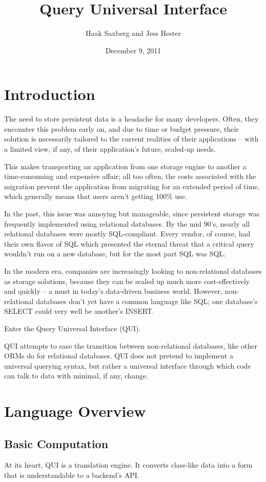 \documentclass{article} %
\title{Query Universal Interface}
\author{Haak Saxberg and Jess Hester}
\date{December 9, 2011}
\begin{document}
\maketitle
\newpage
\tableofcontents

\newpage
\section{Introduction}
The need to store persistent data is a headache for many developers. Often, they encounter this problem early on, and due to time
or budget pressure, their solution is necessarily tailored to the current realities of their applications -- with a limited view, if any, of 
their application's future, scaled-up needs.

This makes transporting an application from one storage engine to another a time-consuming and expensive affair; all too often, the
costs associated with the migration prevent the application from migrating for an extended period of time, which generally means that
users aren't getting 100\% use.

In the past, this issue was annoying but manageable, since persistent storage was frequently implemented using relational databases.
By the mid 90's, nearly all relational databases were mostly SQL-compliant. Every vendor, of course, had their own flavor of SQL which
presented the eternal threat that a critical query wouldn't run on a new database, but for the most part SQL was SQL.

In the modern era, companies are increasingly looking to non-relational databases as storage solutions, because they can be scaled up
much more cost-effectively and quickly -- a must in today's data-driven business world. However, non-relational databases don't yet have
a common language like SQL; one database's SELECT could very well be another's INSERT.

Enter the Query Universal Interface (QUI).

QUI attempts to ease the transition between non-relational databases, like other ORMs do for relational databases. QUI does not pretend
to implement a universal querying syntax, but rather a universal interface through which code can talk to data with minimal, if any, change.

\section{Language Overview}
\subsection{Basic Computation}
At its heart, QUI is a translation engine. It converts class-like data into a form that is understandable to a backend's API.
\end{document}
